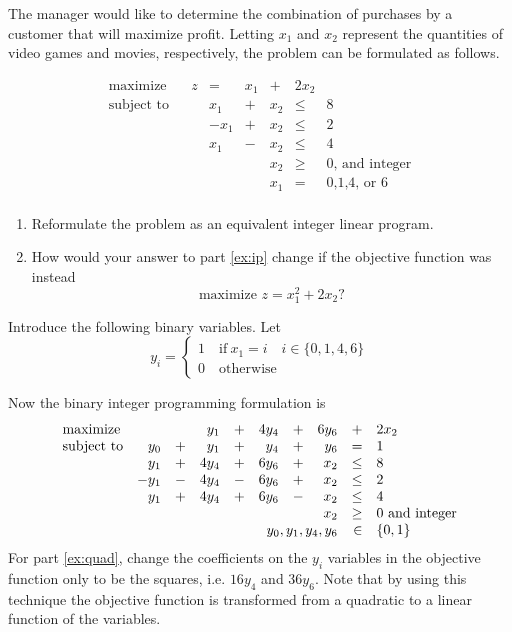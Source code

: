 \begin{enumerate}
The manager would like to determine the combination of purchases by a
customer that will maximize profit. Letting $x_1$ and $x_2$ represent
the quantities of video games and movies, respectively, the problem
can be formulated as follows.

\[
\begin{array}{lrrrrrrl}
\textrm{maximize} &   & z & = & x_1 & + & 2x_2 & \\
\textrm{subject to} & & & x_1 & + & x_2 & \leq & 8 \\
& & & -x_1 & + & x_2 & \leq & 2 \\
& & & x_1 & - & x_2 & \leq & 4 \\
& & & & & x_2 & \geq & \text{0, and integer} \\
& & & & & x_1 & = & \text{0,1,4, or 6} \\
\end{array}
\]

\begin{enumerate}
\item Reformulate the problem as an equivalent integer linear
  program.\label{ex:ip}
\item How would your answer to part \ref{ex:ip} change if the
  objective function was instead
\[ \text{maximize~} z = x_1^2 + 2x_2\text{?} \] \label{ex:quad}
\end{enumerate}

\begin{solution} 
\bs Introduce the following binary variables. Let
\[ y_i = \begin{cases}
1 \quad \text{if}~ x_1 = i \quad i \in \{0,1,4,6\}\\
0 \quad \text{otherwise}
\end{cases}
\]

Now the binary integer programming formulation is
\[
\begin{array}{lrrrrrrrrl}
\textrm{maximize}   &&& y_1 & + & 4y_4 & + & 6y_6 & + & 2x_2 \\
\textrm{subject to} & y_0 & + & y_1 & + & y_4 & + & y_6 & = & 1 \\
& y_1 & + & 4y_4 & + & 6y_6 & + & x_2 & \leq & 8\\
& -y_1 & - & 4y_4 & - & 6y_6 & + & x_2 & \leq & 2\\
& y_1 & + & 4y_4 & + & 6y_6 & - & x_2 & \leq & 4\\
\multicolumn{8}{r}{x_2}& \geq & 0 ~\text{and integer}\\
\multicolumn{8}{r}{y_0,y_1,y_4,y_6}& \in & \{0,1\}
\end{array}
\]
For part \ref{ex:quad}, change the coefficients on the $y_i$
variables in the objective function only to be the squares,
i.e. $16y_4$ and $36y_6$. Note that by using this technique the
objective function is transformed from a quadratic to a linear function
of the variables.
\end{solution}


\end{enumerate}
